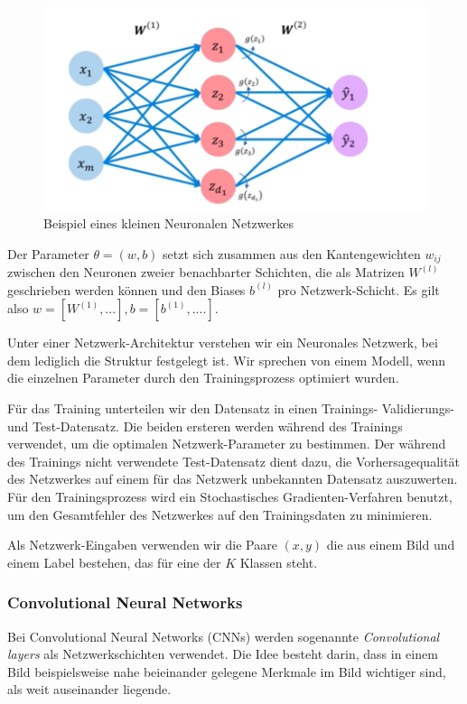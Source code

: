 \documentclass[11pt,a4paper]{article}
\newcommand{\source}[1]{\caption*{\hfill Quelle: {#1}} }
\numberwithin{equation}{section}
\begin{document}
	
	\begin{figure}[ht]
		\centering
		\includegraphics[width=0.3\textheight]{single_layer_nn.png}
	
		\caption{Beispiel eines kleinen Neuronalen Netzwerkes}
		
		\label{im:single_layer_neuralnet}
	\end{figure}

	Der Parameter $\theta = (w,b)$ setzt sich zusammen aus den Kantengewichten $w_{ij}$ zwischen den Neuronen zweier benachbarter Schichten, die als Matrizen $W^{(l)}$ geschrieben werden können und den Biases $b^{(l)}$ pro Netzwerk-Schicht. Es gilt also $w = [W^{(1)}, ...], b = [b^{(1)}, ....]$.

	
	Unter einer Netzwerk-Architektur verstehen wir ein Neuronales Netzwerk, bei dem lediglich die Struktur festgelegt ist. Wir sprechen von einem Modell, wenn die einzelnen Parameter durch den Trainingsprozess optimiert wurden.
	
	Für das Training unterteilen wir den Datensatz in einen Trainings- Validierungs- und Test-Datensatz. Die beiden ersteren werden während des Trainings verwendet, um die optimalen Netzwerk-Parameter zu bestimmen. Der während des Trainings nicht verwendete Test-Datensatz dient dazu, die Vorhersagequalität des Netzwerkes auf einem für das Netzwerk unbekannten Datensatz auszuwerten. Für den Trainingsprozess wird ein Stochastisches Gradienten-Verfahren benutzt, um den Gesamtfehler des Netzwerkes auf den Trainingsdaten zu minimieren.
	
	Als Netzwerk-Eingaben verwenden wir die Paare $(x,y)$ die aus einem Bild und einem Label bestehen, das für eine der $K$ Klassen steht.

	
	\subsubsection{Convolutional Neural Networks}
	Bei Convolutional Neural Networks (CNNs) werden sogenannte \textit{Convolutional layers} als Netzwerkschichten verwendet. Die Idee besteht darin, dass in einem Bild beispielsweise nahe beieinander gelegene Merkmale im Bild wichtiger sind, als weit auseinander liegende. 
	
\end{document}
